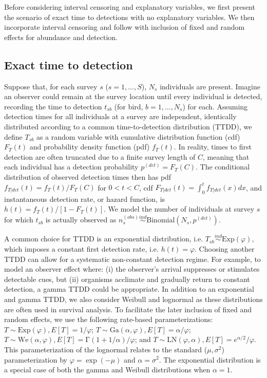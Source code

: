 \documentclass[12pt]{article}
\newcommand{\Exp}{\mbox{Exp}}
\newcommand{\Ga}{\mbox{Ga}}
\newcommand{\We}{\mbox{We}}
\newcommand{\LN}{\mbox{LN}}
\newcommand{\pdet}{p^{(det)}}
\newcommand{\ind}{\stackrel{ind}{\sim}}
\begin{document}
Before considering interval censoring and explanatory variables, we first present the scenario of exact time to detections with no explanatory variables. 
We then incorporate interval censoring and follow with inclusion of fixed and random effects for abundance and detection. 

\subsection{Exact time to detection}

Suppose that, for each survey $s$ ($s=1,\dots,S$), $N_s$ individuals are present.  
Imagine an observer could remain at the survey location until every individual is detected, recording the time to detection $t_{sb}$ (for bird, $b=1,\dots,N_s$) for each.
Assuming detection times for all individuals at a survey are independent, identically distributed according to a common time-to-detection distribution (TTDD), we define $T_{sb}$ as a random variable with cumulative distribution function (cdf) $F_T(t)$ and probability density function (pdf) $f_T(t)$.
In reality, times to first detection are often truncated due to a finite survey length of $C$, meaning that each individual has a detection probability $\pdet=F_T(C)$.  
The conditional distribution of observed detection times then has pdf $f_{T|det}(t)= f_T(t)/F_T(C)$ for $0<t<C$, cdf $F_{T|det}(t) = \int_0^t f_{T|det}(x) dx$, and instantaneous detection rate, or hazard function, is $h(t) = f_T(t) / [1-F_T(t)]$. 
We model the number of individuals at survey $s$ for which $t_{sb}$ is actually observed as $n_{s}^{(obs)} \ind \mbox{Binomial}\left(N_{s}, \pdet\right)$. 

A common choice for TTDD is an exponential distribution, i.e. $T_{sb}\ind \mbox{Exp}(\varphi)$, which imposes a constant first detection rate, i.e. $h(t) = \varphi$.
Choosing another TTDD can allow for a systematic non-constant detection regime. 
For example, to model an observer effect where: (i) the observer's arrival suppresses or stimulates detectable cues, but (ii) organisms acclimate and gradually return to constant detection, a gamma TTDD could be appropriate.
In addition to an exponential and gamma TTDD, we also consider Weibull and lognormal as these distributions are often used in survival analysis. 
To facilitate the later inclusion of fixed and random effects, we use the following rate-based parameterizations: $T\sim \Exp(\varphi), E[T]=1/\varphi$; $T\sim \Ga(\alpha,\varphi), E[T] = \alpha/\varphi$; $T\sim \We(\alpha,\varphi), E[T]=\mathrm{\Gamma}(1+1/\alpha)/\varphi$; and $T\sim \LN(\varphi,\alpha), E[T] = e^{\alpha/2}/\varphi$.  
This parameterization of the lognormal relates to the standard ($\mu, \sigma^2$) parameterization by $\varphi = \exp(-\mu)$ and $\alpha = \sigma^2$.  %
The exponential distribution is a special case of both the gamma and Weibull distributions when $\alpha=1$. 
\end{document}
